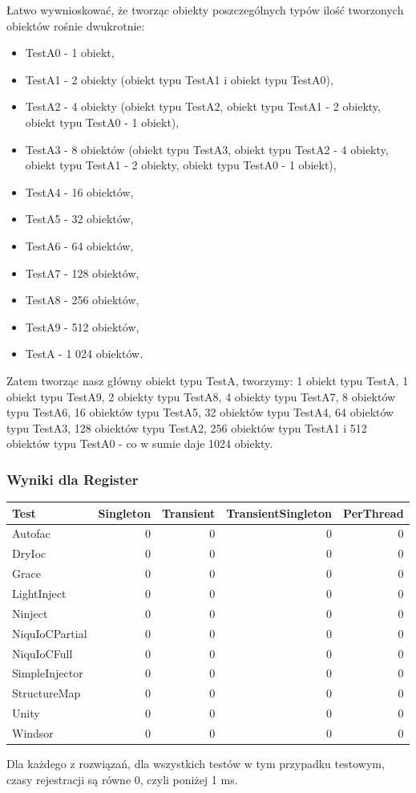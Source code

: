 \documentclass[12pt]{article}
\begin{document}
Łatwo wywnioskować, że tworząc obiekty poszczególnych typów ilość tworzonych obiektów rośnie dwukrotnie:
\begin{itemize}
	\item TestA0 - 1 obiekt,
	\item TestA1 - 2 obiekty (obiekt typu TestA1 i obiekt typu TestA0),
	\item TestA2 - 4 obiekty (obiekt typu TestA2, obiekt typu TestA1 - 2 obiekty, obiekt typu TestA0 - 1 obiekt),
	\item TestA3 - 8 obiektów (obiekt typu TestA3, obiekt typu TestA2 - 4 obiekty, obiekt typu TestA1 - 2 obiekty, obiekt typu TestA0 - 1 obiekt),
	\item TestA4 - 16 obiektów,
	\item TestA5 - 32 obiektów,
	\item TestA6 - 64 obiektów,
	\item TestA7 - 128 obiektów,
	\item TestA8 - 256 obiektów,
	\item TestA9 - 512 obiektów,
	\item TestA - 1 024 obiektów.
\end{itemize}
Zatem tworząc nasz główny obiekt typu TestA, tworzymy: 1 obiekt typu TestA, 1 obiekt typu TestA9, 2 obiekty typu TestA8, 4 obiekty typu TestA7, 8 obiektów typu TestA6, 16 obiektów typu TestA5, 32 obiektów typu TestA4, 64 obiektów typu TestA3, 128 obiektów typu TestA2, 256 obiektów typu TestA1 i 512 obiektów typu TestA0 - co w sumie daje 1024 obiekty.

\subsubsection{Wyniki dla Register}
\begin{center}
\begin{small}
	\begin{tabular}{ | l | r | r | r | r | }
    		\hline
Test & Singleton & Transient & TransientSingleton & PerThread \\ \hline
Autofac & 0 & 0 & 0 & 0 \\ \hline
DryIoc & 0 & 0 & 0 & 0 \\ \hline
Grace & 0 & 0 & 0 & 0 \\ \hline
LightInject & 0 & 0 & 0 & 0 \\ \hline
Ninject & 0 & 0 & 0 & 0 \\ \hline
NiquIoCPartial & 0 & 0 & 0 & 0 \\ \hline
NiquIoCFull & 0 & 0 & 0 & 0 \\ \hline
SimpleInjector & 0 & 0 & 0 & 0 \\ \hline
StructureMap & 0 & 0 & 0 & 0 \\ \hline
Unity & 0 & 0 & 0 & 0 \\ \hline
Windsor & 0 & 0 & 0 & 0 \\ \hline
  	\end{tabular}
\end{small}
\end{center}
Dla każdego z rozwiązań, dla wszystkich testów w tym przypadku testowym, czasy rejestracji są równe 0, czyli poniżej 1 ms.
\end{document}
